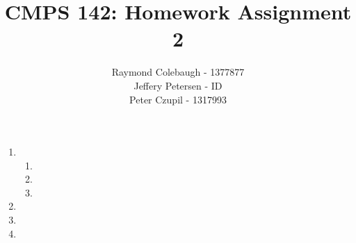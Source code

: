 \documentclass{article}
\title{CMPS 142: Homework Assignment 2}
\author{Raymond Colebaugh - 1377877\\Jeffery Petersen - ID\\Peter Czupil - 1317993}
\begin{document}
\maketitle
\begin{enumerate}
        \item 
            \begin{enumerate}
                \item
                \item 
                \item
            \end{enumerate}
        \item
        \item
        \item
\end{enumerate}
\end{document}
